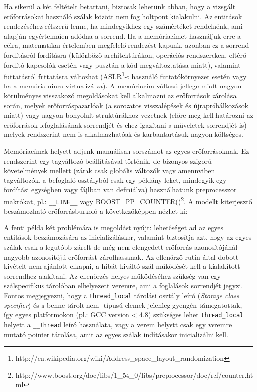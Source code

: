     Ha sikerül a két feltételt betartani, biztosak lehetünk abban, hogy a vizsgált erőforrásokat használó szálak között nem fog holtpont kialakulni. Az entitások rendezéséhez célszerű lenne, ha mindegyikhez egy számértéket rendelnénk, ami alapján egyértelműen adódna a sorrend. Ha a memóriacímet használjuk erre a célra, matematikai értelemben megfelelő rendezést kapunk, azonban ez a sorrend fordításról fordításra (különböző architektúrákon, operációs rendszereken, eltérő fordító kapcsolók esetén vagy pusztán a kód megváltoztatása miatt), valamint futtatásról futtatásra változhat (ASLR\footnote{http://en.wikipedia.org/wiki/Address\_space\_layout\_randomization}-t használó futtatókörnyezet esetén vagy ha a memória nincs virtualizálva). A memóriacím változó jellege miatt nagyon körülményes visszakozó megoldásokat kell alkalmazni az erőforrások zárolása során, melyek erőforráspazarlóak (a sorozatos visszalépések és újrapróbálkozások miatt) vagy nagyon bonyolult struktúrákhoz vezetnek (előre meg kell határozni az erőforrások lefoglalásának sorrendjét és ehez igazítani a műveletek sorrendjét is) melyek rendszerint nem is alkalmazhatóak és karbantartásuk nagyon költséges.
    
    Memóriacímek helyett adjunk manuálisan sorszámot az egyes erőforrásoknak. Ez rendszerint egy tagváltozó beállításával történik, de bizonyos szigorú követelmények mellett (zárak csak globális változók vagy amennyiben tagváltozók, a befoglaló osztályból csak egy példány lehet, mindegyik egy fordítási egységben vagy fájlban van definiálva) használhatunk preprocesszor makrókat, pl.: \texttt{\_\_LINE\_\_} vagy \mbox{BOOST\_PP\_COUNTER()}\footnote{http://www.boost.org/doc/libs/1\_54\_0/libs/preprocessor/doc/ref/counter.html}. A \cite{C++11/Lockable} modellt kiterjesztő beszámozható erőforrásburkoló a következőképpen nézhet ki:
    
    
    A fenti példa két problémára is megoldást nyújt: lehetőséget ad az egyes entitások beszámozására az inicializáláskor, valamint biztosítja azt, hogy az egyes szálak csak a legutóbb zárolt de még nem elengedett erőforrás azonosítójánál nagyobb azonosítójú erőforrást zárolhassanak. Az ellenőrző rutin által dobott kivételt nem ajánlott elkapni, a hibát kiváltó szál működését kell a kialakított sorrendhez alakítani. Az ellenőrzés helyes működéséhez szükség van egy szálspecifikus tárolóban elhelyezett veremre, ami a foglalások sorrendjét jegyzi. Fontos megjegyezni, hogy a \texttt{thread\_local} tárolási osztály leíró (\emph{Storage class specifier}) és a benne tárolt nem \cite{C++11/POD}-típusú elemek jelenleg gyengén támogatottak, így egyes platformokon (pl.: GCC version < 4.8) szükséges lehet \texttt{thread\_local} helyett a \texttt{\_\_thread} leíró használata, vagy a verem helyett csak egy veremre mutató pointer tárolása, amit az egyes szálak indításakor inicializálni kell.
    
